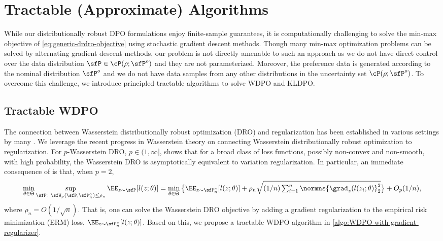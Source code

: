 \section{Tractable (Approximate) Algorithms}
While our distributionally robust DPO formulations enjoy finite-sample guarantees,  it is computationally challenging to solve the min-max objective of \cref{eq:generic-drdro-objective} using stochastic gradient descent methods. Though many min-max optimization problems can be solved by alternating gradient descent methods, our problem is not directly amenable to such an approach as we do not have direct control over the data distribution $\sfP\in\cP(\rho;\sfP^o)$ and they are not parameterized. Moreover, the preference data is generated according to the nominal distribution $\sfP^o$ and we do not have data samples from any other distributions in the uncertainty set $\cP(\rho;\sfP^o)$.  To overcome this challenge, we introduce principled tractable algorithms to solve WDPO and KLDPO.

\subsection{Tractable WDPO}
The connection between Wasserstein distributionally robust optimization (DRO) and regularization has been established in various settings by many \citep{esfahani2015data,shafieezadeh2019regularization,chen2018robust}. We leverage the recent progress in Wasserstein theory on connecting Wasserstein distributionally robust optimization to regularization. For $p$-Wasserstein DRO, $p\in(1,\infty]$, \citet{gao2022wasserstein} shows that for a broad class of loss functions, possibly non-convex and non-smooth, with high probability, the Wasserstein DRO is asymptotically equivalent to variation regularization. In particular, an immediate consequence of \citet[Theorem 1]{gao2022wasserstein} is that, when $p=2$,
\begin{align*}
    \min_{\theta\in\Theta}\sup_{\sfP\colon\sfW_p(\sfP,\sfP^o_n)\leq \rho_n}\EE_{z\sim\sfP}[l(z;\theta)] = \min_{\theta\in\Theta}\big\{ \EE_{z\sim\sfP^o_n}[l(z;\theta)] + \rho_n \sqrt{(1/n)
  \textstyle\sum\nolimits_{i=1}^n\normns{\grad_z(l(z_i;\theta)}_2^2} \big\}+ O_p(1/n),
\end{align*}
where $\rho_n=O(1/\sqrt{n})$. That is, one can solve the Wasserstein DRO objective by adding a gradient regularization to the empirical risk minimization (ERM) loss, $\EE_{z\sim\sfP^o_n}[l(z;\theta)]$. Based on this, we propose a tractable WDPO algorithm in \cref{algo:WDPO-with-gradient-regularizer}.

